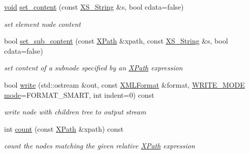 \begin{DoxyCompactItemize}
\hyperlink{interfacevoid}{void} \hyperlink{struct_x_m_l_storage_1_1_x_m_l_node_a613fbbcb12fd8a4ce5712df62baa2f96}{set\+\_\+content} (const \hyperlink{struct_x_m_l_storage_1_1_x_s___string}{X\+S\+\_\+\+String} \&s, bool cdata=false)
\begin{DoxyCompactList}\small\item\em set element node content \end{DoxyCompactList}\item 
\mbox{\label{struct_x_m_l_storage_1_1_x_m_l_node_aa696f7ff943f63b0257b3d879602c0e1}} 
bool \hyperlink{struct_x_m_l_storage_1_1_x_m_l_node_aa696f7ff943f63b0257b3d879602c0e1}{set\+\_\+sub\+\_\+content} (const \hyperlink{struct_x_m_l_storage_1_1_x_path}{X\+Path} \&xpath, const \hyperlink{struct_x_m_l_storage_1_1_x_s___string}{X\+S\+\_\+\+String} \&s, bool cdata=false)
\begin{DoxyCompactList}\small\item\em set content of a subnode specified by an \hyperlink{struct_x_m_l_storage_1_1_x_path}{X\+Path} expression \end{DoxyCompactList}\item 
\mbox{\label{struct_x_m_l_storage_1_1_x_m_l_node_a2008c3695621e81367f6a6501038b5c8}} 
bool \hyperlink{struct_x_m_l_storage_1_1_x_m_l_node_a2008c3695621e81367f6a6501038b5c8}{write} (std\+::ostream \&out, const \hyperlink{struct_x_m_l_storage_1_1_x_m_l_format}{X\+M\+L\+Format} \&format, \hyperlink{xmlstorage_8h_a384e8ed47866fe059e3ad92b8d89d462}{W\+R\+I\+T\+E\+\_\+\+M\+O\+DE} \hyperlink{interfacevoid}{mode}=F\+O\+R\+M\+A\+T\+\_\+\+S\+M\+A\+RT, int indent=0) const
\begin{DoxyCompactList}\small\item\em write node with children tree to output stream \end{DoxyCompactList}\item 
\mbox{\label{struct_x_m_l_storage_1_1_x_m_l_node_adfb84e14f79a44bf2c9f4960c42b2bba}} 
int \hyperlink{struct_x_m_l_storage_1_1_x_m_l_node_adfb84e14f79a44bf2c9f4960c42b2bba}{count} (const \hyperlink{struct_x_m_l_storage_1_1_x_path}{X\+Path} \&xpath) const
\begin{DoxyCompactList}\small\item\em count the nodes matching the given relative \hyperlink{struct_x_m_l_storage_1_1_x_path}{X\+Path} expression \end{DoxyCompactList}\item 

\end{DoxyCompactItemize}
